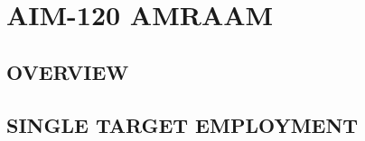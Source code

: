 \documentclass[fontInter]{TechCheck}
\begin{document}
	\clearpage 

	\section{AIM-120 AMRAAM}

	\subsection{OVERVIEW}
	\begin{tableitemize}
	\end{tableitemize}
	
	\clearpage

	\subsection{SINGLE TARGET EMPLOYMENT}
\end{document}
